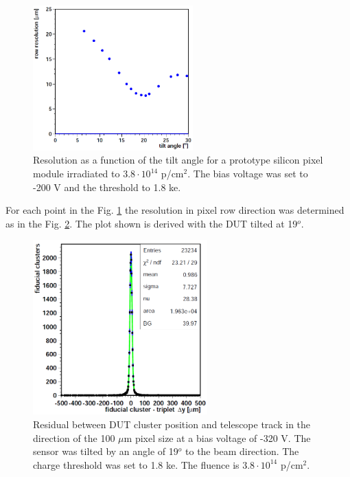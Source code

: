 \begin{figure}[t]
 \centering
 \includegraphics[width=0.55\textwidth]{021_pixel_upgrade/plots/tilt_scan.png}
 \caption{Resolution as a function of the tilt angle for a prototype silicon pixel module irradiated to $3.8 \cdot 10^{14}$ p/cm$^2$. The bias voltage  
 was set to -200 V and the threshold to 1.8 ke.}
 \label{fig:tilt_scan}
\end{figure}

For each point in the Fig. \ref{fig:tilt_scan} the resolution in pixel row direction was determined as in the Fig. \ref{fig:resol}. The plot shown
is derived with the DUT tilted at 19$^{o}$.

\begin{figure}[t]
 \centering
 \includegraphics[width=0.6\textwidth]{021_pixel_upgrade/plots/resol_dist.png}
 \caption{Residual between DUT cluster position and telescope track in the direction of the 100 $\mu$m pixel size at a bias voltage of -320 V. The sensor 
 was tilted by an angle of 19$^{o}$ to the beam direction. The charge threshold was set to 1.8 ke. The fluence is $3.8 \cdot 10^{14}$ p/cm$^2$.}
 \label{fig:resol}
\end{figure}

